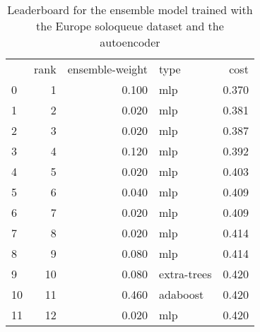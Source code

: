 \begin{table}[]
	\centering
	\begin{tabular}{lrrlr}
		   & rank & ensemble-weight & type        & cost  \\
		0  & 1    & 0.100           & mlp         & 0.370 \\
		1  & 2    & 0.020           & mlp         & 0.381 \\
		2  & 3    & 0.020           & mlp         & 0.387 \\
		3  & 4    & 0.120           & mlp         & 0.392 \\
		4  & 5    & 0.020           & mlp         & 0.403 \\
		5  & 6    & 0.040           & mlp         & 0.409 \\
		6  & 7    & 0.020           & mlp         & 0.409 \\
		7  & 8    & 0.020           & mlp         & 0.414 \\
		8  & 9    & 0.080           & mlp         & 0.414 \\
		9  & 10   & 0.080           & extra-trees & 0.420 \\
		10 & 11   & 0.460           & adaboost    & 0.420 \\
		11 & 12   & 0.020           & mlp         & 0.420 \\
	\end{tabular}

	\caption{Leaderboard for the ensemble model trained with the Europe soloqueue dataset and the autoencoder}
	\label{tab:lb-europe-games-full-autoencode}
\end{table}

